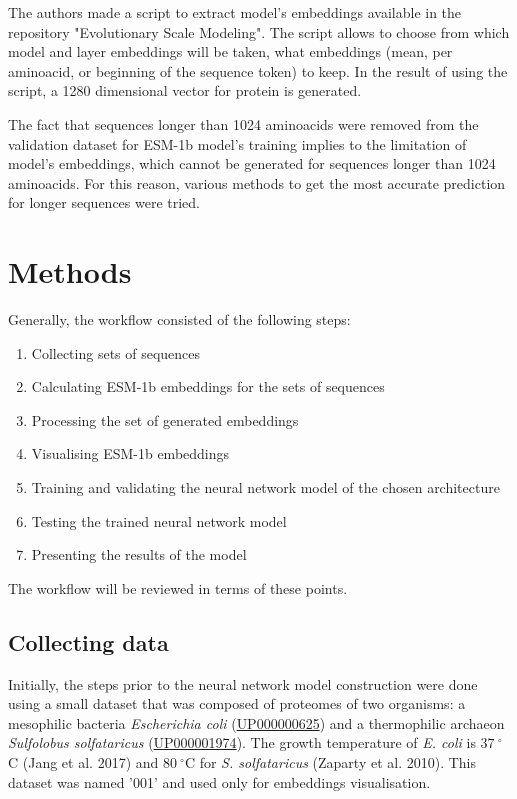 \documentclass[12pt]{report}
\begin{document}
	The authors made a script to extract model's embeddings available in the 
	repository "Evolutionary Scale Modeling". The script allows to choose 
	from which model and layer embeddings will be taken, what embeddings 
	(mean, per aminoacid, or beginning of the sequence token) to keep. In the
	result of using the script, a 1280 dimensional vector for protein is generated.
	
	The fact that sequences longer than 1024 aminoacids were removed from the 
	validation dataset for ESM-1b model's training implies to the limitation of 
	model's embeddings, which cannot be generated for sequences longer than 
	1024 aminoacids. For this reason, various methods to get the most accurate 
	prediction for longer sequences were tried.

	\newpage

	\section{Methods}

	Generally, the workflow consisted of the following steps:

	\begin{enumerate}
		\item Collecting sets of sequences
		\item Calculating ESM-1b embeddings for the sets of sequences
		\item Processing the set of generated embeddings
		\item Visualising ESM-1b embeddings
		\item Training and validating the neural network model of the chosen architecture 
		\item Testing the trained neural network model
		\item Presenting the results of the model
	\end{enumerate}

	The workflow will be reviewed in terms of these points.

	\subsection{Collecting data}

	Initially, the steps prior to the neural network model construction 
	were done using a small dataset that was composed of proteomes of two 
	organisms: a mesophilic bacteria \textit{Escherichia coli} 
	(\href{https://www.uniprot.org/proteomes/UP000000625}{UP000000625}) and a 
	thermophilic archaeon \textit{Sulfolobus solfataricus} 
	(\href{https://www.uniprot.org/proteomes/UP000001974}{UP000001974}). The 
	growth temperature of \textit{E. coli} is $37\ ^\circ$C (Jang et al. 2017) 
	and $80\ ^\circ$C for \textit{S. solfataricus} (Zaparty et al. 2010). This 
	dataset was named '001' and used only for embeddings visualisation.
\end{document}
